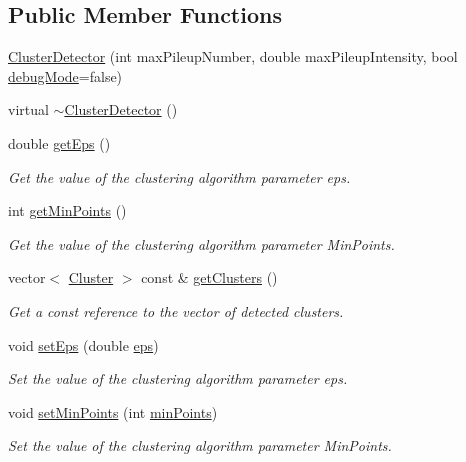 \subsection*{Public Member Functions}
\begin{DoxyCompactItemize}
\item 
\hyperlink{classmultiscale_1_1analysis_1_1ClusterDetector_a2b5da40fb5e977f5bbfe046feeb1b124}{Cluster\-Detector} (int max\-Pileup\-Number, double max\-Pileup\-Intensity, bool \hyperlink{classmultiscale_1_1analysis_1_1Detector_a4b42f796957efd6ee0b8cf7645494a65}{debug\-Mode}=false)
\item 
virtual \hyperlink{classmultiscale_1_1analysis_1_1ClusterDetector_a18f5d5aab155a0a30137364749fb837c}{$\sim$\-Cluster\-Detector} ()
\item 
double \hyperlink{classmultiscale_1_1analysis_1_1ClusterDetector_a5f1699b100e7203720cb7fd1ef73cea1}{get\-Eps} ()
\begin{DoxyCompactList}\small\item\em Get the value of the clustering algorithm parameter eps. \end{DoxyCompactList}\item 
int \hyperlink{classmultiscale_1_1analysis_1_1ClusterDetector_af979c73c154bd42ef73d3328e80889ef}{get\-Min\-Points} ()
\begin{DoxyCompactList}\small\item\em Get the value of the clustering algorithm parameter Min\-Points. \end{DoxyCompactList}\item 
vector$<$ \hyperlink{classmultiscale_1_1analysis_1_1Cluster}{Cluster} $>$ const \& \hyperlink{classmultiscale_1_1analysis_1_1ClusterDetector_a0ed0e389d65161b7eef8f377efb20e5c}{get\-Clusters} ()
\begin{DoxyCompactList}\small\item\em Get a const reference to the vector of detected clusters. \end{DoxyCompactList}\item 
void \hyperlink{classmultiscale_1_1analysis_1_1ClusterDetector_a35eaa560c893a86c3149471f40c15979}{set\-Eps} (double \hyperlink{classmultiscale_1_1analysis_1_1ClusterDetector_a61e876f87d62245eada8f56d587d39cd}{eps})
\begin{DoxyCompactList}\small\item\em Set the value of the clustering algorithm parameter eps. \end{DoxyCompactList}\item 
void \hyperlink{classmultiscale_1_1analysis_1_1ClusterDetector_a190fd17d121e8c22c1ca6e4f5b7a213c}{set\-Min\-Points} (int \hyperlink{classmultiscale_1_1analysis_1_1ClusterDetector_aa94df1adc462be5931ec25ba24122fe9}{min\-Points})
\begin{DoxyCompactList}\small\item\em Set the value of the clustering algorithm parameter Min\-Points. \end{DoxyCompactList}\end{DoxyCompactItemize}
